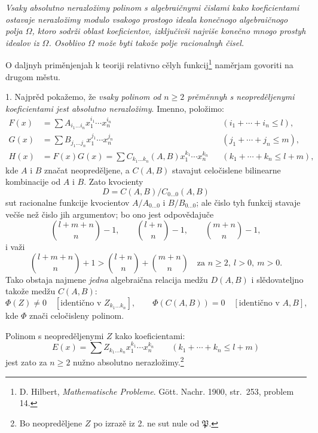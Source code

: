 \documentclass[11pt]{article}
\begin{document}
\emph{Vsaky absolutno nerazložimy polinom s algebraičnymi čislami kako koeficientami ostavaje nerazložimy modulo vsakogo prostogo ideala konečnogo algebraičnogo polja $\Omega$, ktoro sodrži oblast koeficientov, izključivši najviše konečno mnogo prostyh idealov iz $\Omega$. Osoblivo $\Omega$ može byti takože polje racionalnyh čisel.}

O daljnyh priměnjenjah k teoriji relativno cělyh funkcij\footnote{D. Hilbert, \emph{Mathematische Probleme}. Gött. Nachr. 1900, str.~253, problem 14.} naměrjam govoriti na drugom městu.

1. Najprěd pokažemo, že \emph{vsaky polinom od $n\ge2$ prěměnnyh s neopreděljenymi koeficientami jest absolutno nerazložimy}. Imenno, položimo:
\begin{equation}
\begin{aligned}
F(x)&=\sum A_{i_1\ldots i_n}x_1^{i_1}\cdots x_n^{i_n} &&(i_1+\cdots+i_n\le l),\\
G(x)&=\sum B_{j_1\ldots j_n}x_1^{j_1}\cdots x_n^{j_n} &&(j_1+\cdots+j_n\le m),\\
H(x)&=F(x)G(x)=\sum C_{k_1\ldots k_n}(A,B)x_1^{k_1}\cdots x_n^{k_n} &&(k_1+\cdots+k_n\le l+m),
\end{aligned}
\tag{1}
\end{equation}
kde $A$ i $B$ značat neopreděljene, a $C(A,B)$ stavajut celočislene bilinearne kombinacije od $A$ i $B$. Zato kvocienty
\[
D=C(A,B)/C_{0\ldots0}(A,B)
\]
sut racionalne funkcije kvocientov $A/A_{0\ldots0}$ i $B/B_{0\ldots0}$; ale čislo tyh funkcij stavaje večše než čislo jih argumentov; bo ono jest odpovědajuče
\[
\binom{l+m+n}{n}-1,
\qquad
\binom{l+n}{n}-1,
\qquad
\binom{m+n}{n}-1,
\]
i važi
\[
\binom{l+m+n}{n}+1>
\binom{l+n}{n}+\binom{m+n}{n}
\quad\text{za } n\ge2,\ l>0,\ m>0.
\]
Tako obstaja najmene \emph{jedna} algebraična relacija medžu $D(A,B)$ i slědovateljno takože medžu $C(A,B)$:
\begin{equation}
 \Phi(Z)\ne0\quad[\text{identično v }Z_{k_1\ldots k_n}],
 \qquad
 \Phi(C(A,B))=0\quad[\text{identično v }A,B],
\tag{2}
\end{equation}
kde $\Phi$ znači celočisleny polinom.

Polinom s neopreděljenymi $Z$ kako koeficientami:
\begin{equation}
 E(x)=\sum Z_{k_1\ldots k_n}x_1^{k_1}\cdots x_n^{k_n}
 \qquad(k_1+\cdots+k_n\le l+m)
\tag{3}
\end{equation}
jest zato za $n\ge2$ nužno absolutno nerazložimy.\footnote{Bo neopreděljene $Z$ po izrazě iz 2. ne sut nule od $\mathfrak P$.}
\end{document}
